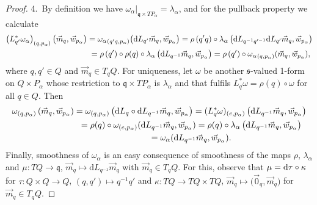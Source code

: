 \documentclass[11pt]{article}
\numberwithin{equation}{section}
\begin{document}
\begin{proof}
4.~By def\/inition we have $\omega_\alpha|_{\mathfrak{q}\times TP_\alpha}=\lambda_\alpha$, and for the pullback property we
calculate
\begin{gather*}
\left(L_{q'}^{*}\omega_\alpha\right)_{(q,p_\alpha)}\big(\vec{m}_q,\vec{w}_{p_\alpha}\big)
={\omega_\alpha}_{(q'q,p_\alpha)}\big(\mathrm{d}
L_{q'}\vec{m}_q,\vec{w}_{p_\alpha}\big)
=\rho\left(q'q\right)\circ\lambda_\alpha\left(\mathrm{d} L_{q^{-1}q'^{-1}}\mathrm{d}
L_{q'}\vec{m}_q,\vec{w}_{p_\alpha}\right)
\\
\hphantom{\left(L_{q'}^{*}\omega_\alpha\right)_{(q,p_\alpha)}\big(\vec{m}_q,\vec{w}_{p_\alpha}\big)}{}
=\rho\left(q'\right)\circ\rho(q)\circ \lambda_\alpha\left(\mathrm{d}
L_{q^{-1}}\vec{m}_q,\vec{w}_{p_\alpha}\right)
=\rho\left(q'\right)\circ {\omega_\alpha}_{(q,p_\alpha)}(\vec{m}_q,\vec{w}_{p_\alpha}),
\end{gather*}
where $q,q'\in Q$ and $\vec{m}_q\in T_qQ$.
For uniqueness, let $\omega$ be another $\mathfrak{s}$-valued 1-form on $Q\times P_\alpha$ whose restriction to
$\mathfrak{q}\times TP_\alpha$ is $\lambda_\alpha$ and that fulf\/ils $L_q^{*}\omega=\rho(q)\circ \omega$ for all $q\in Q$.
Then
\begin{gather*}
\omega_{(q,p_\alpha)}\left(\vec{m}_q,\vec{w}_{p_\alpha}\right)={\omega}_{(q,p_\alpha)}\left(\mathrm{d} L_q\circ
\mathrm{d} L_{q^{-1}}\vec{m}_q,\vec{w}_{p_\alpha}\right) =(L_q^{*}\omega)_{(e,p_\alpha)}\left(\mathrm{d}
L_{q^{-1}}\vec{m}_q,\vec{w}_{p_\alpha}\right)
\\
\hphantom{\omega_{(q,p_\alpha)}\left(\vec{m}_q,\vec{w}_{p_\alpha}\right)}{}
=\rho(q)\circ \omega_{(e,p_\alpha)}(\mathrm{d} L_{q^{-1}}\vec{m}_q,\vec{w}_{p_\alpha}) = \rho(q)\circ
\lambda_\alpha\left(\mathrm{d} L_{q^{-1}}\vec{m}_q,\vec{w}_{p_\alpha}\right)
\\
\hphantom{\omega_{(q,p_\alpha)}\left(\vec{m}_q,\vec{w}_{p_\alpha}\right)}{}
=\omega_\alpha(\mathrm{d} L_{q^{-1}}\vec{m}_q,\vec{w}_{p_\alpha}).
\end{gather*}
Finally, smoothness of $\omega_\alpha$ is an easy consequence of smoothness of the maps $\rho$, $\lambda_\alpha$ and
$\mu \colon TQ\rightarrow \mathfrak{q}$, $\vec{m}_q \mapsto \mathrm{d} L_{q^{-1}}\vec{m}_q$ with $\vec{m}_q\in T_qQ$.
For this, observe that $\mu={\rm d}\tau \circ \kappa$ for $\tau\colon Q\times Q\rightarrow Q$, $(q,q')\mapsto q^{-1}q'$ and
$\kappa\colon TQ\rightarrow TQ\times TQ$, $\vec{m}_q\mapsto \big(\vec{0}_q,\vec{m}_q\big)$ for $\vec{m}_q\in T_qQ$.
\end{proof}
\end{document}
